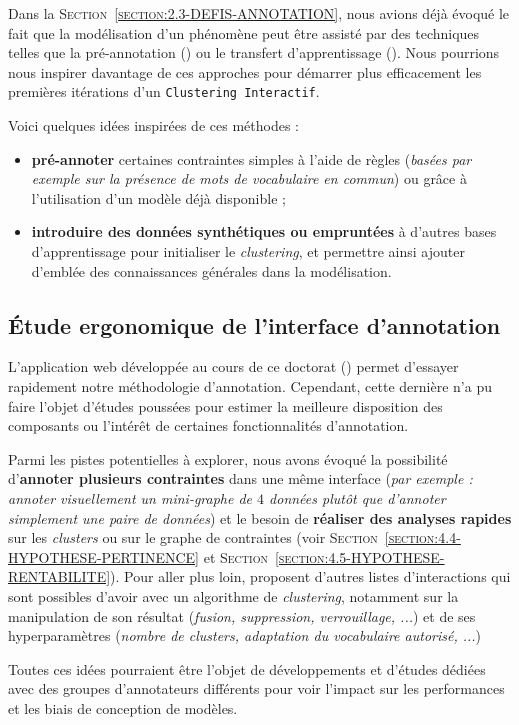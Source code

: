 		Dans la \textsc{Section~\ref{section:2.3-DEFIS-ANNOTATION}}, nous avions déjà évoqué le fait que la modélisation d'un phénomène peut être assisté par des techniques telles que la pré-annotation (\cite{dandapat-etal:2009:complex-linguistic-annotation}) ou le transfert d'apprentissage (\cite{zhuang-etal:2021:comprehensive-survey-transfer}).
		Nous pourrions nous inspirer davantage de ces approches pour démarrer plus efficacement les premières itérations d'un \texttt{Clustering Interactif}.
	
		Voici quelques idées inspirées de ces méthodes :
		\begin{itemize}
			\item \textbf{pré-annoter} certaines contraintes simples à l'aide de règles (\textit{basées par exemple sur la présence de mots de vocabulaire en commun}) ou grâce à l'utilisation d'un modèle déjà disponible ; 
			\item \textbf{introduire des données synthétiques ou empruntées} à d'autres bases d'apprentissage pour initialiser le \textit{clustering}, et permettre ainsi ajouter d'emblée des connaissances générales dans la modélisation.
		\end{itemize}
	
	
	\subsection{Étude ergonomique de l'interface d'annotation}
	\label{section:4.7.5-HYPOTHESES-NON-VERIFIEES-ERGONOMIQUE}
	
		L'application web développée au cours de ce doctorat (\cite{schild-etal:2022:cognitivefactory-interactiveclusteringgui}) permet d'essayer rapidement notre méthodologie d'annotation.
		Cependant, cette dernière n'a pu faire l'objet d'études poussées pour estimer la meilleure disposition des composants ou l'intérêt de certaines fonctionnalités d'annotation.
		
		Parmi les pistes potentielles à explorer, nous avons évoqué la possibilité d'\textbf{annoter plusieurs contraintes} dans une même interface (\textit{par exemple : annoter visuellement un mini-graphe de $4$ données plutôt que d'annoter simplement une paire de données}) et le besoin de \textbf{réaliser des analyses rapides} sur les \textit{clusters} ou sur le graphe de contraintes (voir \textsc{Section~\ref{section:4.4-HYPOTHESE-PERTINENCE}} et \textsc{Section~\ref{section:4.5-HYPOTHESE-RENTABILITE}}).
		Pour aller plus loin, \cite{bae-etal:2021:interactive-clustering-comprehensive} proposent d'autres listes d'interactions qui sont possibles d'avoir avec un algorithme de \textit{clustering}, notamment sur la manipulation de son résultat (\textit{fusion, suppression, verrouillage, ...}) et de ses hyperparamètres (\textit{nombre de \textit{clusters}, adaptation du vocabulaire autorisé, ...})
		
		Toutes ces idées pourraient être l'objet de développements et d'études dédiées avec des groupes d'annotateurs différents pour voir l'impact sur les performances et les biais de conception de modèles.